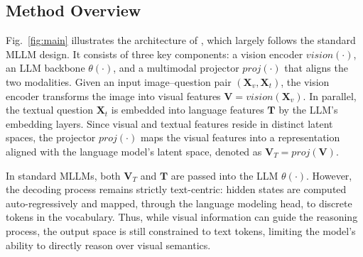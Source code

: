 \subsection{Method Overview}\label{ssec:lvr_overview}



Fig.~\ref{fig:main} illustrates the architecture of \modelname, which largely follows the standard MLLM design. It consists of three key components: a vision encoder \( vision(\cdot) \), an LLM backbone \( \theta(\cdot) \), and a multimodal projector \( proj(\cdot) \) that aligns the two modalities. Given an input image–question pair \((\mathbf{X}_v, \mathbf{X}_t)\), the vision encoder transforms the image into visual features \( \mathbf{V} = vision(\mathbf{X}_v) \). In parallel, the textual question \(\mathbf{X}_t\) is embedded into language features \(\mathbf{T}\) by the LLM’s embedding layers. Since visual and textual features reside in distinct latent spaces, the projector \( proj(\cdot) \) maps the visual features into a representation aligned with the language model’s latent space, denoted as \( \mathbf{V}_T = proj(\mathbf{V}) \).  

In standard MLLMs, both $\mathbf{V}_T$ and $\mathbf{T}$ are passed into the LLM $\theta(\cdot)$. However, the decoding process remains strictly text-centric: hidden states are computed auto-regressively and mapped, through the language modeling head, to discrete tokens in the vocabulary. Thus, while visual information can guide the reasoning process, the output space is still constrained to text tokens, limiting the model’s ability to directly reason over visual semantics.  

